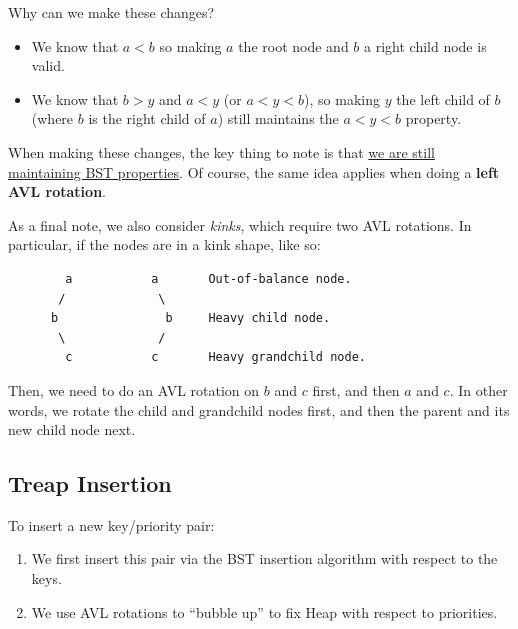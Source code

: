 \documentclass[letterpaper]{article}
\begin{document}
Why can we make these changes? 
\begin{itemize}
    \item We know that $a < b$ so making $a$ the root node and $b$ a right child node is valid. 
    \item We know that $b > y$ and $a < y$ (or $a < y < b$), so making $y$ the left child of $b$ (where $b$ is the right child of $a$) still maintains the $a < y < b$ property. 
\end{itemize}
When making these changes, the key thing to note is that \underline{we are still maintaining BST properties}. Of course, the same idea applies when doing a \textbf{left AVL rotation}. 

\bigskip 

As a final note, we also consider \emph{kinks}, which require two AVL rotations. In particular, if the nodes are in a kink shape, like so: 
\begin{verbatim}
        a           a       Out-of-balance node. 
       /             \
      b               b     Heavy child node. 
       \             /
        c           c       Heavy grandchild node.
\end{verbatim}
Then, we need to do an AVL rotation on $b$ and $c$ first, and then $a$ and $c$. In other words, we rotate the child and grandchild nodes first, and then the parent and its new child node next. 

\subsection{Treap Insertion}
To insert a new key/priority pair: 
\begin{enumerate}[(1)]
    \item We first insert this pair via the BST insertion algorithm with respect to the keys. 
    \item We use AVL rotations to ``bubble up'' to fix Heap with respect to priorities. 
\end{enumerate}
\end{document}
